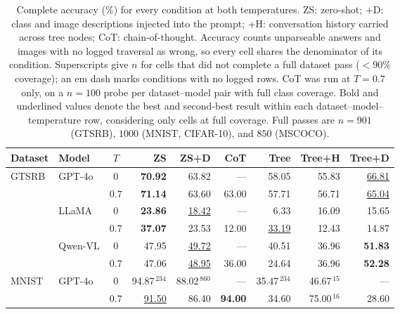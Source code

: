 \documentclass[10pt,twocolumn,letterpaper]{article}
\begin{document}
\begin{table}[t]
\centering
\caption{Complete accuracy (\%) for every condition at both temperatures. ZS: zero-shot; +D: class and image descriptions injected into the prompt; +H: conversation history carried across tree nodes; CoT: chain-of-thought. Accuracy counts unparseable answers and images with no logged traversal as wrong, so every cell shares the denominator of its condition. Superscripts give $n$ for cells that did not complete a full dataset pass ($<90\%$ coverage); an em dash marks conditions with no logged rows. CoT was run at $T{=}0.7$ only, on a $n{=}100$ probe per dataset--model pair with full class coverage. Bold and underlined values denote the best and second-best result within each dataset--model--temperature row, considering only cells at full coverage. Full passes are $n=901$ (GTSRB), $1000$ (MNIST, CIFAR-10), and $850$ (MSCOCO).}
\label{tab:supp_full}
\footnotesize
\setlength{\tabcolsep}{4.6pt}
\begin{tabular}{@{}ll c rrrrrr@{}}
\toprule
\textbf{Dataset} & \textbf{Model} & $T$ & \textbf{ZS} & \textbf{ZS+D} & \textbf{CoT} & \textbf{Tree} & \textbf{Tree+H} & \textbf{Tree+D} \\
\midrule
GTSRB     & GPT-4o   & $0$ &   \textbf{70.92} &            63.82 &              --- &            58.05 &            55.83 & \underline{66.81} \\
          &          & $0.7$ &   \textbf{71.14} &            63.60 &            63.00 &            57.71 &            56.71 & \underline{65.04} \\
\cmidrule(l){2-9}
          & LLaMA    & $0$ &   \textbf{23.86} & \underline{18.42} &              --- &             6.33 &            16.09 &            15.65 \\
          &          & $0.7$ &   \textbf{37.07} &            23.53 &            12.00 & \underline{33.19} &            12.43 &            14.87 \\
\cmidrule(l){2-9}
          & Qwen-VL  & $0$ &            47.95 & \underline{49.72} &              --- &            40.51 &            36.96 &   \textbf{51.83} \\
          &          & $0.7$ &            47.06 & \underline{48.95} &            36.00 &            24.64 &            36.96 &   \textbf{52.28} \\
\midrule
MNIST     & GPT-4o   & $0$ &  94.87$^{\,234}$ &  88.02$^{\,860}$ &              --- &  35.47$^{\,234}$ &   46.67$^{\,15}$ &              --- \\
          &          & $0.7$ & \underline{91.50} &            86.40 &   \textbf{94.00} &            34.60 &   75.00$^{\,16}$ &            28.60 \\

\end{tabular}
\end{table}
\end{document}
